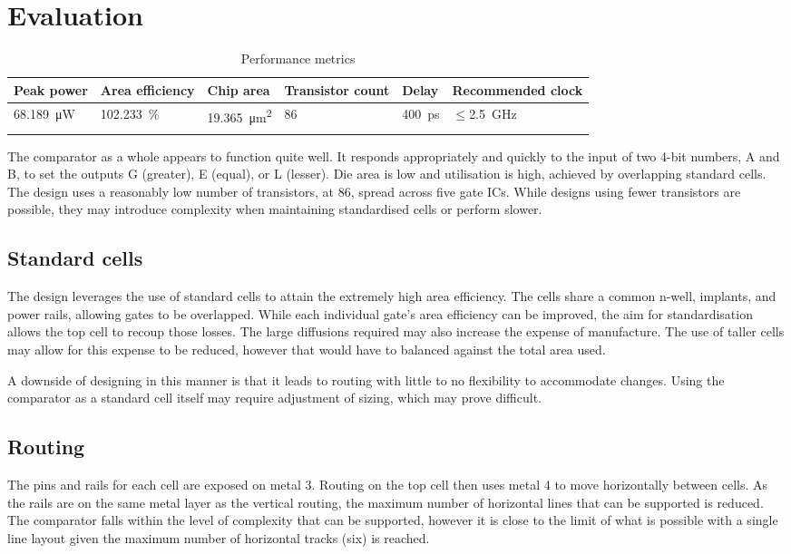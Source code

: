 \clearpage
\section{Evaluation}

\begin{xltabular}{\textwidth}{YYYYYY}
    \hline
    Peak power & Area efficiency & Chip area & Transistor count & Delay & Recommended clock \\
    \hline
    \qty{68.189}{\uW} & \qty{102.233}{\percent} & \qty{19.365}{\um\squared} & 86 & \qty{400}{\ps} & $\leqslant$\qty{2.5}{\GHz}  \\
    \hline    
    \caption{Performance metrics}
\end{xltabular} 

The comparator as a whole appears to function quite well. 
It responds appropriately and quickly to the input of two 4-bit numbers, A and B, to set 
the outputs G (greater), E (equal), or L (lesser). 
Die area is low and utilisation is high, achieved by overlapping standard cells.
The design uses a reasonably low number of transistors, at 86, spread across five 
gate ICs. While designs using fewer transistors are possible, they may introduce 
complexity when maintaining standardised cells or perform slower. 

\subsection{Standard cells}
The design leverages the use of standard cells to attain the extremely high area
efficiency. The cells share a common n-well, implants, and power rails, allowing 
gates to be overlapped. While each individual gate's area efficiency can be improved, 
the aim for standardisation allows the top cell to recoup those losses. The large diffusions 
required may also increase the expense of manufacture. 
The use of taller cells may allow for this expense to be reduced, however that would 
have to balanced against the total area used. 

A downside of designing in this manner is that it leads to routing with little to no 
flexibility to accommodate changes. Using the comparator as a standard cell itself 
may require adjustment of sizing, which may prove difficult. 

\subsection{Routing}
The pins and rails for each cell are exposed on metal 3. Routing on the top cell
then uses metal 4 to move horizontally between cells. As the rails are on 
the same metal layer as the vertical routing, the maximum number of horizontal lines that 
can be supported is reduced. The comparator falls within the level of complexity that 
can be supported, however it is close to the limit of what is possible with a single line
layout given the maximum number of horizontal tracks (six) is reached. 

